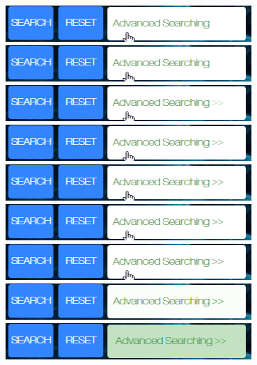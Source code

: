 \documentclass[10pt,twoside,a4paper,titlepage]{article}
\begin{document}
		\newline	\includegraphics[width=0.7\textwidth]{cyf/Advanced_searching13.png}
		\newline	\includegraphics[width=0.7\textwidth]{cyf/Advanced_searching14.png}
		\newline	\includegraphics[width=0.7\textwidth]{cyf/Advanced_searching15.png}
		\newline	\includegraphics[width=0.7\textwidth]{cyf/Advanced_searching16.png}
		\newline	\includegraphics[width=0.7\textwidth]{cyf/Advanced_searching17.png}
		\newline	\includegraphics[width=0.7\textwidth]{cyf/Advanced_searching18.png}
		\newline	\includegraphics[width=0.7\textwidth]{cyf/Advanced_searching19.png}
		\newline	\includegraphics[width=0.7\textwidth]{cyf/Advanced_searching20.png}
		\newline	\includegraphics[width=0.7\textwidth]{cyf/Advanced_searching21.png}
\end{document}
